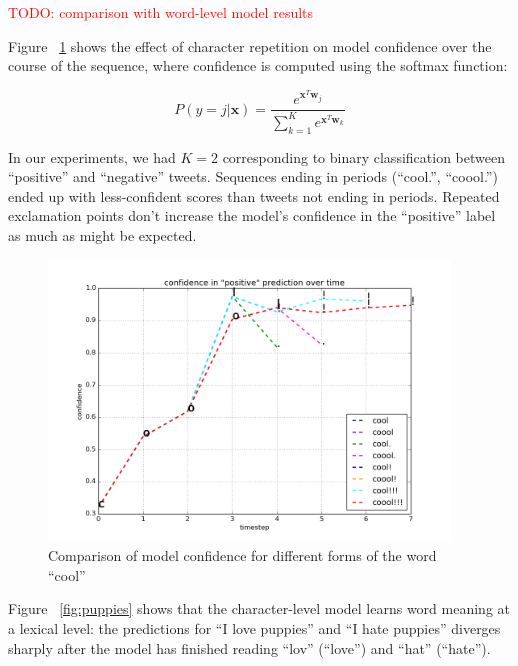 \documentclass{article} %
\newcommand{\todo}[1]{\textcolor{red}{TODO: #1}}
\begin{document}
\todo{comparison with word-level model results}

Figure ~\ref{fig:cool} shows the effect of character repetition on model confidence over the course of the sequence, where confidence is computed using the softmax function:

$$P(y = j|\mathbf{x}) = \frac{e^{\mathbf{x}^T \mathbf{w}_j}}{\sum_{k=1}^{K} e^{\mathbf{x}^T \mathbf{w}_k}}$$

In our experiments, we had $K = 2$ corresponding to binary classification between ``positive'' and ``negative'' tweets. Sequences ending in periods (``cool.'', ``coool.'') ended up with less-confident scores than tweets not ending in periods. Repeated exclamation points don't increase the model's confidence in the ``positive'' label as much as might be expected. 

\begin{figure}[h!]
\begin{center}
\includegraphics[width=0.95\textwidth]{figs/cool}
\end{center}
\caption{Comparison of model confidence for different forms of the word ``cool''}
\label{fig:cool}
\end{figure}

Figure ~\ref{fig:puppies} shows that the character-level model learns word meaning at a lexical level: the predictions for ``I love puppies'' and ``I hate puppies'' diverges sharply after the model has finished reading ``lov'' (``love'') and ``hat'' (``hate'').
\end{document}
